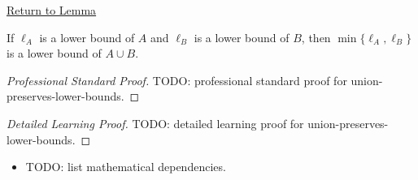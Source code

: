 \newpage
{}
\label{prf:union-preserves-lower-bounds}

\begin{remark*}[Return]
\hyperref[lem:union-preserves-lower-bounds]{Return to Lemma}
\end{remark*}

\begin{lemma*}
If $\ell_A$ is a lower bound of $A$ and $\ell_B$ is a lower bound of $B$,
then $\min\{\ell_A,\ell_B\}$ is a lower bound of $A\cup B$.
\end{lemma*}

\begin{proof}[Professional Standard Proof]
\LRAProofBodyStart
TODO: professional standard proof for union-preserves-lower-bounds.
\end{proof}

\begin{proof}[Detailed Learning Proof]
\LRAProofBodyStart
TODO: detailed learning proof for union-preserves-lower-bounds.
\end{proof}

\begin{remark*}
\end{remark*}

\begin{dependencies}
\begin{itemize}
  \item TODO: list mathematical dependencies.
\end{itemize}
\end{dependencies}

\clearpage
